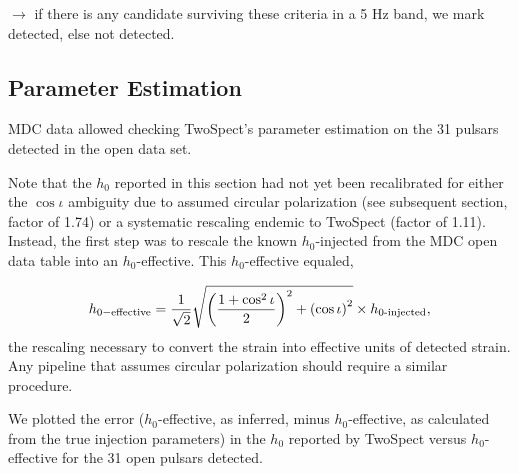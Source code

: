 $\rightarrow$ if there is any candidate surviving these criteria in a 5 Hz band, we mark detected, else not detected.

\subsection{Parameter Estimation}

MDC data allowed checking TwoSpect's parameter estimation on the 31 pulsars detected in the open data set.

Note that the $h_0$ reported in this section had not yet been recalibrated for either the $\cos \iota$ ambiguity due to assumed circular polarization (see subsequent section, factor of 1.74) or a systematic rescaling endemic to TwoSpect (factor of 1.11). 
Instead, the first step was to rescale the known $h_0$-injected from the MDC open data table into an $h_0$-effective. 
This $h_0$-effective equaled,

\begin{equation} h_{0-\textup{effective}} = \frac{1}{\sqrt{2}}\sqrt{ \left(\frac{1+\cos^2 \iota}{2}\right)^2 + \left(\cos \iota\right)^2 } \times h_{0\textup{-injected}},
\end{equation}
\noindent the rescaling necessary to convert the strain into effective units of detected strain. 
Any pipeline that assumes circular polarization should require a similar procedure.

We plotted the error ($h_0$-effective, as inferred, minus $h_0$-effective, as calculated from the true injection parameters) in the $h_0$ reported by TwoSpect versus $h_0$-effective for the 31 open pulsars detected.

